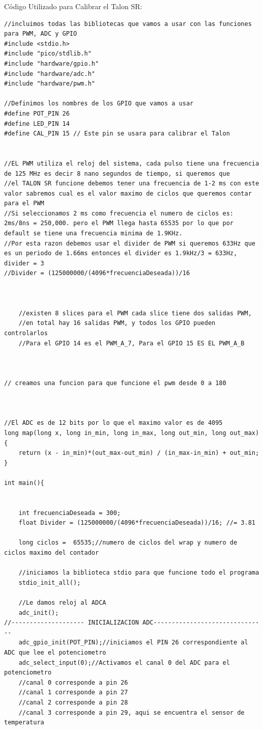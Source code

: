 \documentclass[12pt]{book} %
\begin{document}
Código Utilizado para Calibrar el Talon SR:\\

\begin{lstlisting}
//incluimos todas las bibliotecas que vamos a usar con las funciones para PWM, ADC y GPIO
#include <stdio.h>
#include "pico/stdlib.h"
#include "hardware/gpio.h"
#include "hardware/adc.h"
#include "hardware/pwm.h"

//Definimos los nombres de los GPIO que vamos a usar
#define POT_PIN 26
#define LED_PIN 14
#define CAL_PIN 15 // Este pin se usara para calibrar el Talon


//EL PWM utiliza el reloj del sistema, cada pulso tiene una frecuencia de 125 MHz es decir 8 nano segundos de tiempo, si queremos que
//el TALON SR funcione debemos tener una frecuencia de 1-2 ms con este valor sabremos cual es el valor maximo de ciclos que queremos contar para el PWM
//Si seleccionamos 2 ms como frecuencia el numero de ciclos es: 2ms/8ns = 250,000. pero el PWM llega hasta 65535 por lo que por default se tiene una frecuencia minima de 1.9KHz.
//Por esta razon debemos usar el divider de PWM si queremos 633Hz que es un periodo de 1.66ms entonces el divider es 1.9kHz/3 = 633Hz, divider = 3
//Divider = (125000000/(4096*frecuenciaDeseada))/16



    //existen 8 slices para el PWM cada slice tiene dos salidas PWM, 
    //en total hay 16 salidas PWM, y todos los GPIO pueden controlarlos
    //Para el GPIO 14 es el PWM_A_7, Para el GPIO 15 ES EL PWM_A_B
    


// creamos una funcion para que funcione el pwm desde 0 a 180



//El ADC es de 12 bits por lo que el maximo valor es de 4095
long map(long x, long in_min, long in_max, long out_min, long out_max)
{
    return (x - in_min)*(out_max-out_min) / (in_max-in_min) + out_min;
}

int main(){
    
    
    int frecuenciaDeseada = 300;
    float Divider = (125000000/(4096*frecuenciaDeseada))/16; //= 3.81
    
    long ciclos =  65535;//numero de ciclos del wrap y numero de ciclos maximo del contador

    //iniciamos la biblioteca stdio para que funcione todo el programa
    stdio_init_all();

    //Le damos reloj al ADCA	
    adc_init();
//-------------------- INICIALIZACION ADC-------------------------------
    adc_gpio_init(POT_PIN);//iniciamos el PIN 26 correspondiente al ADC que lee el potenciometro
    adc_select_input(0);//Activamos el canal 0 del ADC para el potenciometro
    //canal 0 corresponde a pin 26
    //canal 1 corresponde a pin 27
    //canal 2 corresponde a pin 28
    //canal 3 corresponde a pin 29, aqui se encuentra el sensor de temperatura
    

\end{lstlisting}
\end{document}

